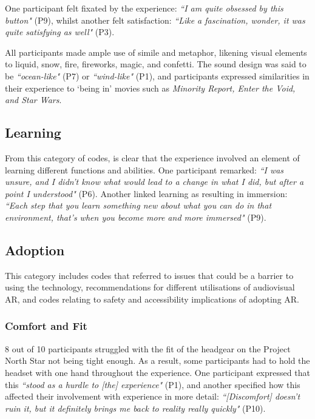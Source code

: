 One participant felt fixated by the experience: \textit{``I am quite obsessed by this button"} (P9), whilst another felt satisfaction: \textit{``Like a fascination, wonder, it was quite satisfying as well"} (P3).

All participants made ample use of simile and metaphor, likening visual elements to liquid, snow, fire, fireworks, magic, and confetti. The sound design was said to be \textit{``ocean-like"} (P7) or \textit{``wind-like"} (P1), and participants expressed similarities in their experience to ‘being in’ movies such as \textit{Minority Report, Enter the Void, and Star Wars}.

\subsection{Learning}\label{sec: polaris-feedback-learning}
From this category of codes, is clear that the experience involved an element of learning different functions and abilities. One participant remarked: \textit{``I was unsure, and I didn’t know what would lead to a change in what I did, but after a point I understood"} (P6). Another linked learning as resulting in immersion: \textit{``Each step that you learn something new about what you can do in that environment, that’s when you become more and more immersed"} (P9).

\subsection{Adoption}\label{sec: polaris-feedback-adoption}
This category includes codes that referred to issues that could be a barrier to using the technology, recommendations for different utilisations of audiovisual AR, and codes relating to safety and accessibility implications of adopting AR.

\subsubsection{Comfort and Fit}\label{sec: polaris-feedback-adoption-comfort}
8 out of 10 participants struggled with the fit of the headgear on the Project North Star not being tight enough. As a result, some participants had to hold the headset with one hand throughout the experience. One participant expressed that this \textit{``stood as a hurdle to [the] experience"} (P1), and another specified how this affected their involvement with experience in more detail: \textit{``[Discomfort] doesn’t ruin it, but it definitely brings me back to reality really quickly"} (P10).
